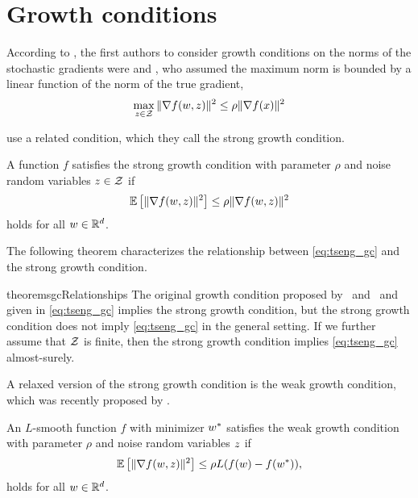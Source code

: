 \section{Growth conditions}\label{sec:growth_conditions}

According to \citet{schmidt2013fast}, the first authors to consider growth conditions on the norms of the stochastic gradients were \citet{tseng1998incremental} and
\citet{solodov1998incremental}, who assumed the maximum norm is bounded by a linear function of the norm of the true gradient,
\begin{align}
    \max_{z \in \mathcal{Z}} \|\nabla f(w, z)\|^2 \leq \rho \|\nabla f(x)\|^2 \label{eq:tseng_gc}
\end{align}

\citet{vaswani2019fast} use a related condition, which they call the strong growth condition.
\begin{definition}\label{def:strong_growth}
    A function \(f\) satisfies the strong growth condition with parameter \(\rho \) and noise random variables \(z \in \mathcal{Z} \) if
    \[ \mathbb{E}\left[\|\nabla f(w, z)\|^2\right] \leq \rho \|\nabla f(w, z)\|^2 \]
    holds for all \(w \in \mathbb{R}^d\).
\end{definition}

The following theorem characterizes the relationship between \autoref{eq:tseng_gc} and the strong growth condition.

\begin{restatable}{theorem}{sgcRelationships}\label{thm:sgc_relationships}
    The original growth condition proposed by~\citet{solodov1998incremental} and~\citet{tseng1998incremental} and given in \autoref{eq:tseng_gc} implies the strong growth condition, but
    the strong growth condition does not imply \autoref{eq:tseng_gc} in the general setting.
    If we further assume that \( \mathcal{Z} \) is finite, then the strong growth condition implies \autoref{eq:tseng_gc} almost-surely.
\end{restatable} 


A relaxed version of the strong growth condition is the weak growth condition, which was recently proposed by \citet{vaswani2019fast}.

\begin{definition}\label{def:weak_growth}
    An \(L\)-smooth function \(f\) with minimizer \(w^* \) satisfies the weak growth condition with parameter \(\rho \) and noise random variables \( z \) if
    \[ \mathbb{E}\left[\|\nabla f(w, z)\|^2\right] \leq \rho L (f(w) - f(w^*)), \]
    holds for all \(w \in \mathbb{R}^d\).
\end{definition}


